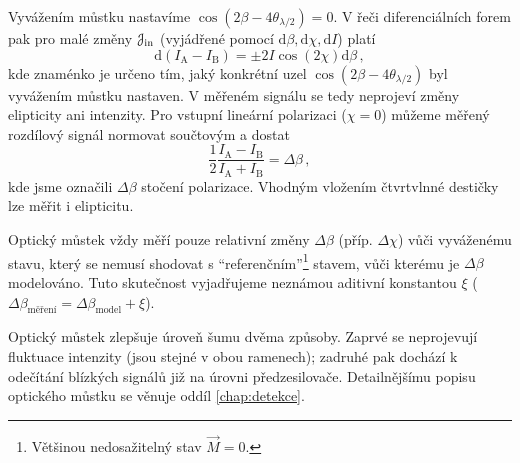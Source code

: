 Vyvážením můstku nastavíme $\cos(2\beta-4\theta_{\lambda/2})=0$. 
V řeči diferenciálních forem pak pro malé změny $\mathcal{J}_\textrm{in}$ (vyjádřené pomocí $\textrm{d}\beta, \textrm{d}\chi, \textrm{d}I$) platí
\begin{equation}
\label{eqn:A-B-mustek}
    \textrm{d}(I_\textrm{A}-I_\textrm{B})=\pm 2I\cos(2\chi) \textrm{d}\beta \,,
\end{equation}
kde znaménko je určeno tím, jaký konkrétní uzel $\cos(2\beta-4\theta_{\lambda/2})$ byl vyvážením můstku nastaven.
V měřeném signálu se tedy neprojeví změny elipticity ani intenzity.
Pro vstupní lineární polarizaci ($\chi=0$) můžeme měřený rozdílový signál normovat součtovým a dostat
\begin{equation}
\label{eqn:mustek-delta-beta}
    \frac{1}{2}\frac{I_\textrm{A}-I_\textrm{B}}{I_\textrm{A}+I_\textrm{B}}=\Delta\beta \,,
\end{equation}
kde jsme označili $\Delta\beta$ stočení polarizace.
Vhodným vložením čtvrtvlnné destičky lze měřit i elipticitu\cite{silberQuadraticMagnetoopticKerr2019a}.

Optický můstek vždy měří pouze relativní změny $\Delta\beta$ (příp. $\Delta\chi$) vůči vyváženému stavu, který se nemusí shodovat s ``referenčním''\footnote{Většinou nedosažitelný stav $\vec{M}=0$.} stavem, vůči kterému je $\Delta\beta$ modelováno.
Tuto skutečnost vyjadřujeme neznámou aditivní konstantou $\xi$ ($\Delta\beta_\textrm{měření}=\Delta\beta_\textrm{model}+\xi$).

Optický můstek zlepšuje úroveň šumu dvěma způsoby.
Zaprvé se neprojevují fluktuace intenzity (jsou stejné v obou ramenech); zadruhé pak dochází k odečítání blízkých signálů již na úrovni předzesilovače.
Detailnějšímu popisu optického můstku se věnuje oddíl \ref{chap:detekce}.

